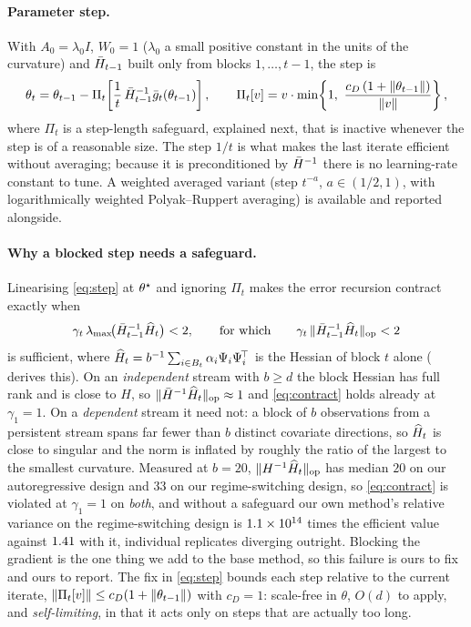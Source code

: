\paragraph{Parameter step.} With $A_0=\lambda_0 I$, $W_0=1$ ($\lambda_0$ a small positive constant
in the units of the curvature) and $\bar{H}_{t-1}$ built only from blocks $1,\dots,t-1$, the step is
\begin{equation}
\theta_t=\theta_{t-1}-\Pi_t\!\left[\frac{1}{t}\,\Hb_{t-1}^{-1}\gb_t(\theta_{t-1})\right],
\qquad
\Pi_t[v]=v\cdot\min\!\left\{1,\ \frac{c_D\,(1+\norm{\theta_{t-1}})}{\norm{v}}\right\},
\label{eq:step}
\end{equation}
where $\Pi_t$ is a step-length safeguard, explained next, that is inactive whenever the step is of a
reasonable size. The step $1/t$ is what makes the last iterate efficient without averaging; because
it is preconditioned by $\bar{H}^{-1}$ there is no learning-rate constant to tune. A weighted averaged
variant (step $t^{-a}$, $a\in(1/2,1)$, with logarithmically weighted Polyak--Ruppert averaging) is
available and reported alongside.

\paragraph{Why a blocked step needs a safeguard.} Linearising \eqref{eq:step} at $\theta^\star$ and ignoring
$\Pi_t$ makes the error recursion contract exactly when
\begin{equation}
\gamma_t\,\lambda_{\max}\!\big(\bar{H}_{t-1}^{-1}\widehat H_t\big)<2 ,
\qquad\text{for which}\qquad
\gamma_t\,\lVert \bar{H}_{t-1}^{-1}\widehat H_t \rVert_{\mathrm{op}}<2
\label{eq:contract}
\end{equation}
is sufficient, where $\widehat H_t=b^{-1}\sum_{i\in B_t}\alpha_i\Psi_i\Psi_i^{\!\top}$ is the Hessian of block
$t$ alone ( derives this). On an \emph{independent} stream with $b\ge d$ the block
Hessian has full rank and is close to $H$, so $\lVert \bar{H}^{-1}\widehat H_t \rVert_{\mathrm{op}}\approx1$ and \eqref{eq:contract}
holds already at $\gamma_1=1$. On a \emph{dependent} stream it need not: a block of $b$ observations
from a persistent stream spans far fewer than $b$ distinct covariate directions, so $\widehat H_t$ is close to
singular and the norm is inflated by roughly the ratio of the largest to the smallest curvature.
Measured at $b=20$, $\lVert H^{-1}\widehat H_t \rVert_{\mathrm{op}}$ has median $20$ on our autoregressive design and $33$ on our
regime-switching design, so \eqref{eq:contract} is violated at $\gamma_1=1$ on \emph{both}, and without
a safeguard our own method's relative variance on the regime-switching design is $1.1\times10^{14}$
times the efficient value against $1.41$ with it, individual replicates diverging
outright. Blocking the gradient is the one thing we add to the base method, so this failure is ours to
fix and ours to report. The fix in \eqref{eq:step} bounds each step relative to the current iterate,
$\lVert \Pi_t[v] \rVert\le c_D(1+\lVert \theta_{t-1} \rVert)$ with $c_D=1$: scale-free in $\theta$, $O(d)$ to apply,
and \emph{self-limiting}, in that it acts only on steps that are actually too long.

